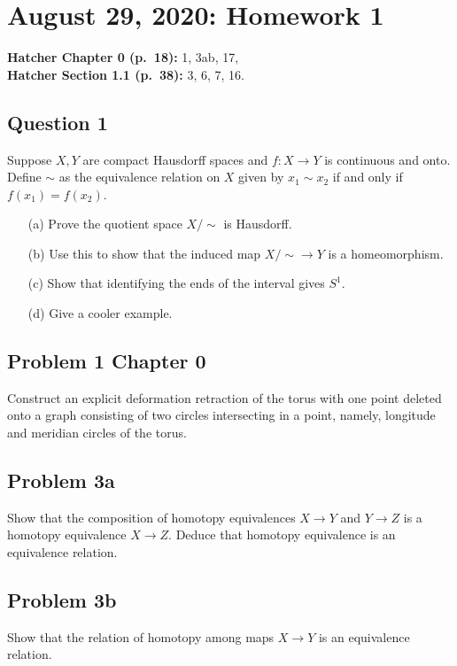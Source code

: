 \section{August 29, 2020: Homework 1}
\textbf{Hatcher Chapter 0 (p.\ 18):} 1, 3ab, 17,\\
\textbf{Hatcher Section 1.1 (p.\ 38):} 3, 6, 7, 16.
\subsection{Question 1}
\begin{problem}
    Suppose $X, Y$ are compact Hausdorff spaces and $ f \colon X \to Y$ is continuous and onto. Define $\sim$ as the equivalence relation on $X$ given by $x_1\sim x_2$ if and only if $f(x_1)=f(x_2)$.
   \begin{enumerate}
       \item[(a)] Prove the quotient space $X/ \sim$ is Hausdorff.
       \item[(b)] Use this to show that the induced map $X/\sim \to Y$ is a homeomorphism.
       \item[(c)] Show that identifying the ends of the interval gives $S^{1}$.
       \item[(d)] Give a cooler example.
   \end{enumerate} 
\end{problem}

\subsection{Problem 1 Chapter 0}
\begin{prob}
   Construct an explicit deformation retraction of the torus with one point deleted onto a graph consisting of two circles intersecting in a point, namely, longitude and meridian circles of the torus. 
\end{prob}

\subsection{Problem 3a}
\begin{prob}
    Show that the composition of homotopy equivalences $X \to Y$ and $Y \to Z$ is a homotopy equivalence $X \to Z$. Deduce that homotopy equivalence is an equivalence relation.
\end{prob}

\subsection{Problem 3b}
\begin{prob}
    Show that the relation of homotopy among maps $X \to Y$ is an equivalence relation.
\end{prob}

